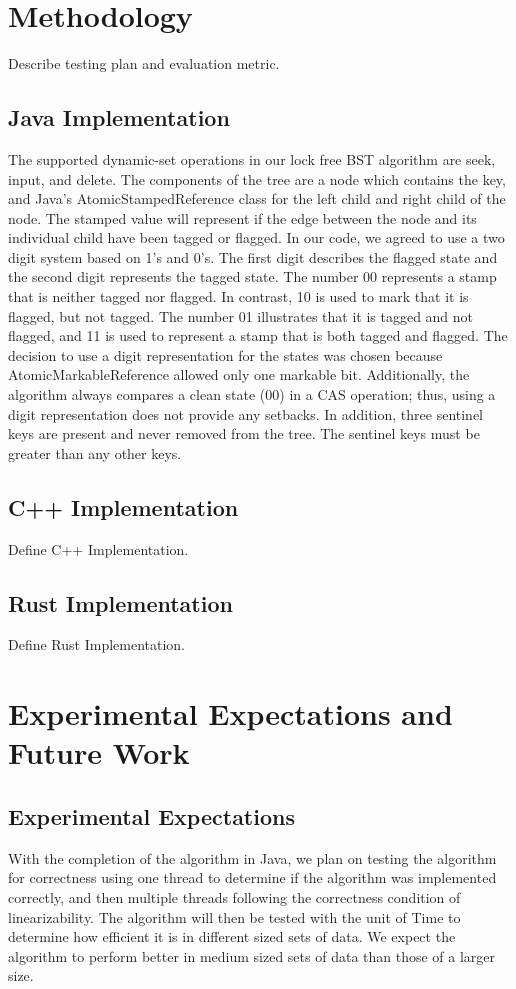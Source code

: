 \documentclass[conference]{IEEEtran}
\begin{document}
\section{Methodology}
Describe testing plan and evaluation metric.
\subsection{Java Implementation}\label{AA}
The supported dynamic-set operations in our lock free BST algorithm are seek, input, and delete. The components of the tree are a node which contains the key, and Java’s AtomicStampedReference class for the left child and right child of the node. The stamped value will represent if the edge between the node and its individual child have been tagged or flagged. In our code, we agreed to use a two digit system based on 1’s and 0’s. The first digit describes the flagged state and the second digit represents the tagged state. The number 00 represents a stamp that is neither tagged nor flagged. In contrast, 10 is used to mark that it is flagged, but not tagged. The number 01 illustrates that it is tagged and not flagged, and 11 is used to represent a stamp that is both tagged and flagged. The decision to use a digit representation for the states was chosen because AtomicMarkableReference allowed only one markable bit. Additionally, the algorithm always compares a clean state (00) in a CAS operation; thus, using a digit representation does not provide any setbacks. In addition, three sentinel keys are present and never removed from the tree. The sentinel keys must be greater than any other keys.

\subsection{C++ Implementation}\label{AA}
Define C++ Implementation.

\subsection{Rust Implementation}\label{AA}
Define Rust Implementation.

\section{Experimental Expectations and Future Work }
\subsection{Experimental Expectations}\label{AA}
With the completion of the algorithm in Java, we plan on testing the algorithm for correctness using one thread to determine if the algorithm was implemented correctly, and then multiple threads following the correctness condition of linearizability. The algorithm will then be tested with the unit of Time to determine how efficient it is in different sized sets of data. We expect the algorithm to perform better in medium sized sets of data than those of a larger size. 
\end{document}
